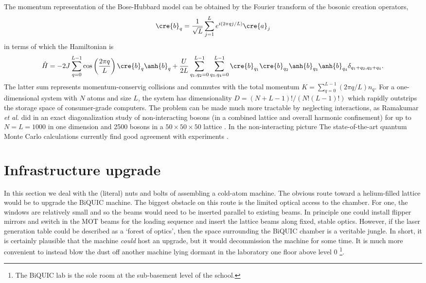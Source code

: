 	The momentum representation of the Bose-Hubbard model can be obtained by the Fourier transform\cite{Zhang10} of the bosonic creation operators,
	\begin{equation}
		\cre{b}_q = \frac{1}{\sqrt{L}}\sum_{j=1}^{L}e^{i(2\pi q j/L)}\cre{a}_j
	\end{equation}
	in terms of which the Hamiltonian is
	\begin{equation}
		\hat{H} = -2J\sum_{q=0}^{L-1}\cos\left(\frac{2\pi q}{L}\right)\cre{b}_q\anh{b}_q + \frac{U}{2L}\sum_{q_1,q_2=0}^{L-1}\sum_{q_3,q_4=0}^{L-1}\cre{b}_{q_1}\cre{b}_{q_2}\anh{b}_{q_3}\anh{b}_{q_4}\delta_{q_1+q_2,q_3+q_4}.
	\end{equation}
	The latter sum represents momentum-conservig collisions and commutes with the total momentum $K = \sum_{q=0}^{L-1}(2\pi q/L)n_q$.
	For a one-dimensional system with $N$ atoms and size $L$, the system has dimensionality $D = (N+L-1)!/(N!(L-1)!)$ which rapidly outstrips the storage space of consumer-grade computers.
	The problem can be made much more tractable by neglecting interactions, as Ramakumar \emph{et al.} did in an exact diagonalization study of non-interacting bosons (in a combined lattice and overall harmonic confinement) for up to $N=L=1000$ in one dimension and 2500 bosons in a $50\times50\times50$ lattice \cite{Ramakumar07}.
	In the non-interacting picture 
	The state-of-the-art quantum Monte Carlo calculations currently find good agreement with experiments \cite{Cayla18,Herce21}.

\section{Infrastructure upgrade}



	
	In this section we deal with the (literal) nuts and bolts of assembling a cold-atom machine.
	The obvious route toward a helium-filled lattice would be to upgrade the BiQUIC machine.
	The biggest obstacle on this route is the limited optical access to the chamber.
	For one, the windows are relatively small and so the beams would need to be inserted parallel to existing beams.
	In principle one could install flipper mirrors and switch in the MOT beams for the loading sequence and insert the lattice beams along fixed, stable optics.
	However, if the laser generation table could be described as a `forest of optics', then the space surrounding the BiQUIC chamber is a veritable jungle.
	In short, it is certainly plausible that the machine \emph{could} host an upgrade, but it would decommission the machine for some time.
	It is much more convenient to instead blow the dust off another machine lying dormant in the laboratory one floor above level 0 \footnote{The BiQUIC lab is the sole room at the sub-basement level of the school.}.

